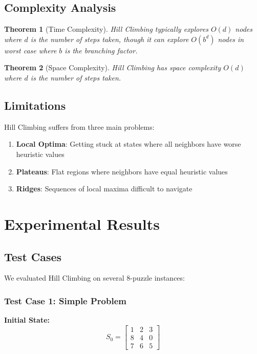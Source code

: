 \documentclass[12pt,a4paper]{article}
\newtheorem{theorem}{Theorem}
\begin{document}
\subsection{Complexity Analysis}

\begin{theorem}[Time Complexity]
Hill Climbing typically explores $O(d)$ nodes where $d$ is the number of steps taken, though it can explore $O(b^d)$ nodes in worst case where $b$ is the branching factor.
\end{theorem}

\begin{theorem}[Space Complexity]
Hill Climbing has space complexity $O(d)$ where $d$ is the number of steps taken.
\end{theorem}

\subsection{Limitations}

Hill Climbing suffers from three main problems:
\begin{enumerate}
    \item \textbf{Local Optima}: Getting stuck at states where all neighbors have worse heuristic values
    \item \textbf{Plateaus}: Flat regions where neighbors have equal heuristic values
    \item \textbf{Ridges}: Sequences of local maxima difficult to navigate
\end{enumerate}

\section{Experimental Results}

\subsection{Test Cases}

We evaluated Hill Climbing on several 8-puzzle instances:

\subsubsection{Test Case 1: Simple Problem}

\textbf{Initial State:}
\[
S_0 = \begin{bmatrix}
1 & 2 & 3 \\
8 & 4 & 0 \\
7 & 6 & 5
\end{bmatrix}
\]
\end{document}
